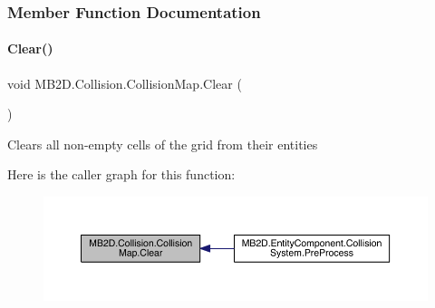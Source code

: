 \subsubsection{Member Function Documentation}
\hypertarget{class_m_b2_d_1_1_collision_1_1_collision_map_ac7eeef6db2deadf738ea40ff939759ff}{}\label{class_m_b2_d_1_1_collision_1_1_collision_map_ac7eeef6db2deadf738ea40ff939759ff} 
\paragraph{\texorpdfstring{Clear()}{Clear()}}
{\footnotesize\ttfamily void M\+B2\+D.\+Collision.\+Collision\+Map.\+Clear (\begin{DoxyParamCaption}{ }\end{DoxyParamCaption})\hspace{0.3cm}{\ttfamily [inline]}}



Clears all non-\/empty cells of the grid from their entities 

Here is the caller graph for this function\+:
\nopagebreak
\begin{figure}[H]
\begin{center}
\leavevmode
\includegraphics[width=350pt]{class_m_b2_d_1_1_collision_1_1_collision_map_ac7eeef6db2deadf738ea40ff939759ff_icgraph}
\end{center}
\end{figure}
\hypertarget{class_m_b2_d_1_1_collision_1_1_collision_map_acbc6d9d9bb85342cf8f07c22f6947b27}{}\label{class_m_b2_d_1_1_collision_1_1_collision_map_acbc6d9d9bb85342cf8f07c22f6947b27} 
